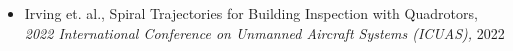 \begin{itemize} 
\item Irving et. al., Spiral Trajectories for Building Inspection with Quadrotors, \textit{ 2022 International Conference on Unmanned Aircraft Systems (ICUAS),} 2022 
\end{itemize} 
